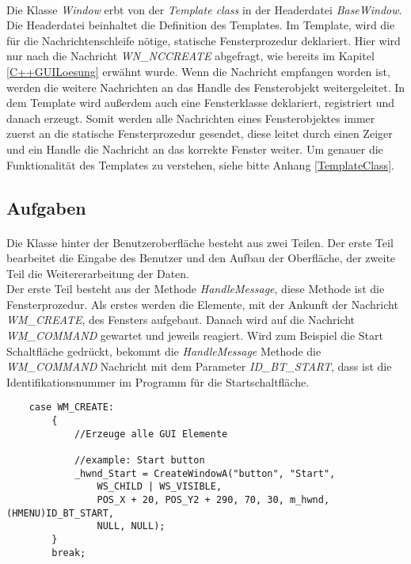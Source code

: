 \paragraph{}
Die Klasse \textit{Window} erbt von der \textit{Template class} in der Headerdatei \textit{BaseWindow}. Die Headerdatei beinhaltet die Definition des Templates. Im Template, wird die für die Nachrichtenschleife nötige, statische Fensterprozedur deklariert. Hier wird nur nach die Nachricht \textit{WN\_NCCREATE} abgefragt, wie bereits im Kapitel \ref{C++GUILoesung} erwähnt wurde. Wenn die Nachricht empfangen worden ist, werden die weitere Nachrichten an das Handle des Fensterobjekt weitergeleitet. In dem Template wird außerdem auch eine Fensterklasse deklariert, registriert und danach erzeugt. Somit werden alle Nachrichten eines Fensterobjektes immer zuerst an die statische Fensterprozedur gesendet, diese leitet durch einen Zeiger und ein Handle die Nachricht an das korrekte Fenster weiter. Um genauer die Funktionalität des Templates zu verstehen, siehe bitte Anhang \ref{TemplateClass}.

\subsection{Aufgaben}
\paragraph{}
Die Klasse hinter der Benutzeroberfläche besteht aus zwei Teilen. Der erste Teil bearbeitet die Eingabe des Benutzer und den Aufbau der Oberfläche, der zweite Teil die Weitererarbeitung der Daten.\\

Der erste Teil besteht aus der Methode \textit{HandleMessage}, diese Methode ist die Fensterprozedur. Als erstes werden die Elemente, mit der Ankunft der Nachricht \textit{WM\_CREATE}, des Fensters aufgebaut. Danach wird auf die Nachricht \textit{WM\_COMMAND} gewartet und jeweils reagiert. Wird zum Beispiel die Start Schaltfläche gedrückt, bekommt die \textit{HandleMessage} Methode die \textit{WM\_COMMAND} Nachricht mit dem Parameter \textit{ID\_BT\_START}, dass ist die Identifikationsnummer im Programm für die Startschaltfläche.\\

\begin{lstlisting}	 
    case WM_CREATE:
        {
            //Erzeuge alle GUI Elemente
            
            //example: Start button
            _hwnd_Start = CreateWindowA("button", "Start",
				WS_CHILD | WS_VISIBLE,
				POS_X + 20, POS_Y2 + 290, 70, 30, m_hwnd, (HMENU)ID_BT_START,
				NULL, NULL);
        }
        break;
\end{lstlisting}

